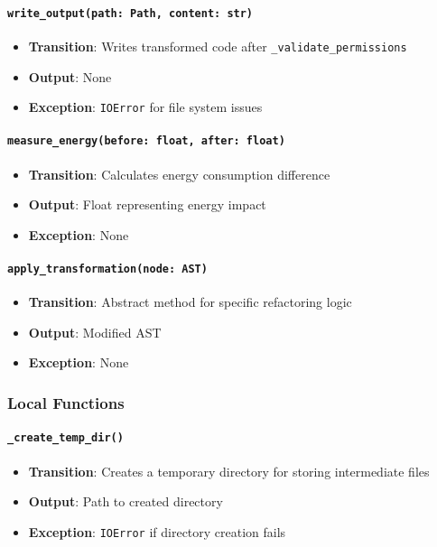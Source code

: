 \documentclass[12pt, titlepage]{article}
\begin{document}
\paragraph{\texttt{write\_output(path: Path, content: str)}}
\begin{itemize}
  \item \textbf{Transition}: Writes transformed code after \texttt{\_validate\_permissions}
  \item \textbf{Output}: None
  \item \textbf{Exception}: \texttt{IOError} for file system issues
\end{itemize}

\paragraph{\texttt{measure\_energy(before: float, after: float)}}
\begin{itemize}
  \item \textbf{Transition}: Calculates energy consumption difference
  \item \textbf{Output}: Float representing energy impact
  \item \textbf{Exception}: None
\end{itemize}

\paragraph{\texttt{apply\_transformation(node: AST)}}
\begin{itemize}
  \item \textbf{Transition}: Abstract method for specific refactoring logic
  \item \textbf{Output}: Modified AST
  \item \textbf{Exception}: None
\end{itemize}

\subsubsection{Local Functions}

\paragraph{\texttt{\_create\_temp\_dir()}}
\begin{itemize}
  \item \textbf{Transition}: Creates a temporary directory for storing intermediate files
  \item \textbf{Output}: Path to created directory
  \item \textbf{Exception}: \texttt{IOError} if directory creation fails
\end{itemize}
\end{document}
